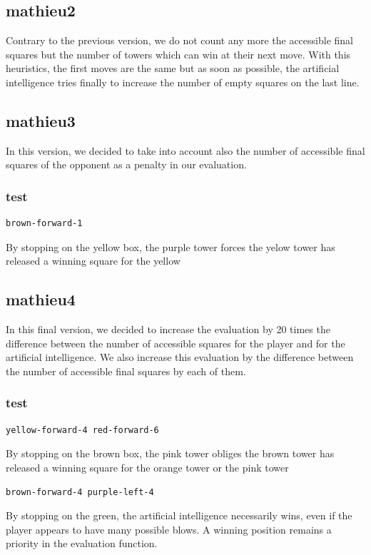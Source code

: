 \documentclass[a4paper, 11pt]{article}
\begin{document}
\subsection{mathieu2}
Contrary to the previous version, we do not count any more the accessible final squares but the number of towers which can win at their next move. 
With this heuristics, the first moves are the same but as soon as possible, the artificial intelligence tries finally to increase the number of empty squares on the last line.

\subsection{mathieu3}
In this version, we decided to take into account also the number of accessible final squares of the opponent as a penalty in our evaluation.

\subsubsection{test}
\begin{verbatim}
brown-forward-1
\end{verbatim}
By stopping on the yellow box, the purple tower forces the yelow tower has released a winning square for the yellow

\subsection{mathieu4}
In this final version, we decided to increase the evaluation by 20 times the difference between the number of accessible squares for the player and for the artificial intelligence. We also increase this evaluation by the difference between the number of accessible final squares by each of them.

\subsubsection{test}
\begin{verbatim}
yellow-forward-4 red-forward-6
\end{verbatim}
By stopping on the brown box, the pink tower obliges the brown tower has released a winning square for the orange tower or the pink tower
\begin{verbatim}
brown-forward-4 purple-left-4
\end{verbatim}
By stopping on the green, the artificial intelligence necessarily wins, even if the player appears to have many possible blows. A winning position remains a priority in the evaluation function.
\end{document}
